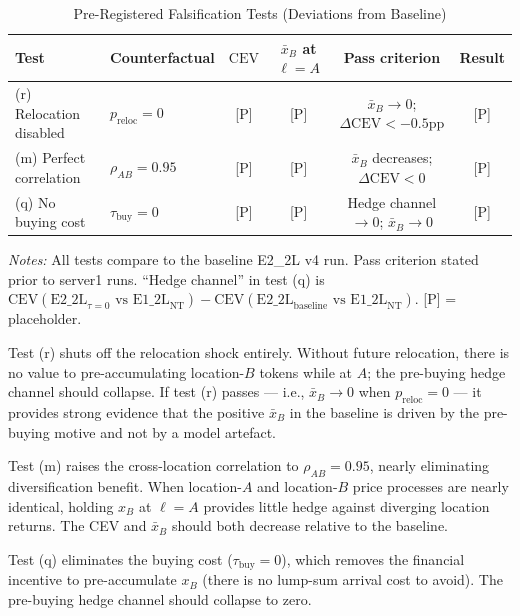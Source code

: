 \begin{table}[t]
\centering
\caption{Pre-Registered Falsification Tests
         (Deviations from Baseline)}
\label{tab:falsification}
\small
\begin{tabular}{llcccc}
\toprule
Test & Counterfactual & $\text{CEV}$ & $\bar{x}_B$ at $\ell{=}A$
     & Pass criterion & Result \\
\midrule
(r) Relocation disabled
    & $p_{\text{reloc}} = 0$
    & \textsc{[P]}
    & \textsc{[P]}
    & $\bar{x}_B \to 0$;\; $\Delta\text{CEV} < -0.5$pp
    & \textsc{[P]} \\[4pt]
(m) Perfect correlation
    & $\rho_{AB} = 0.95$
    & \textsc{[P]}
    & \textsc{[P]}
    & $\bar{x}_B$ decreases;\; $\Delta\text{CEV} < 0$
    & \textsc{[P]} \\[4pt]
(q) No buying cost
    & $\tau_{\text{buy}} = 0$
    & \textsc{[P]}
    & \textsc{[P]}
    & Hedge channel $\to 0$;\; $\bar{x}_B \to 0$
    & \textsc{[P]} \\
\bottomrule
\end{tabular}
\vspace{4pt}
\begin{minipage}{\linewidth}
\small\textit{Notes:}
All tests compare to the baseline E2\_2L v4 run.
Pass criterion stated prior to server1 runs.
``Hedge channel'' in test (q) is
$\text{CEV}(\text{E2\_2L}_{\tau=0} \text{ vs E1\_2L}_{\text{NT}}) - \text{CEV}(\text{E2\_2L}_{\text{baseline}} \text{ vs E1\_2L}_{\text{NT}})$.
\textsc{[P]} = placeholder.
\end{minipage}
\end{table}

Test (r) shuts off the relocation shock entirely.
Without future relocation, there is no value to pre-accumulating
location-$B$ tokens while at $A$; the pre-buying hedge channel
should collapse.
If test (r) passes --- i.e., $\bar{x}_B \to 0$ when $p_{\text{reloc}} = 0$
--- it provides strong evidence that the positive $\bar{x}_B$ in the
baseline is driven by the pre-buying motive and not by a model artefact.

Test (m) raises the cross-location correlation to $\rho_{AB} = 0.95$,
nearly eliminating diversification benefit.
When location-$A$ and location-$B$ price processes are nearly identical,
holding $x_B$ at $\ell = A$ provides little hedge against diverging location returns.
The CEV and $\bar{x}_B$ should both decrease relative to the baseline.

Test (q) eliminates the buying cost ($\tau_{\text{buy}} = 0$), which
removes the financial incentive to pre-accumulate $x_B$ (there is no lump-sum
arrival cost to avoid).
The pre-buying hedge channel should collapse to zero.

